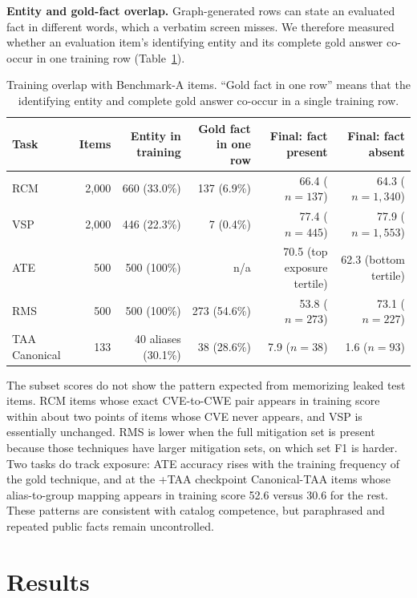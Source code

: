\documentclass[conference]{IEEEtran}
\begin{document}
\textbf{Entity and gold-fact overlap.} Graph-generated rows can state an evaluated fact in different words, which a verbatim screen misses. We therefore measured whether an evaluation item's identifying entity and its complete gold answer co-occur in one training row (Table~\ref{tab:overlap}).

\begin{table}[t]
\caption{Training overlap with Benchmark-A items. ``Gold fact in one row'' means that the identifying entity and complete gold answer co-occur in a single training row.}
\label{tab:overlap}
\centering
\scriptsize
\setlength{\tabcolsep}{3.5pt}
\begin{tabular}{@{}lrrrrr@{}}
\toprule
Task & Items & Entity in training & Gold fact in one row & Final: fact present & Final: fact absent \\
\midrule
RCM & 2,000 & 660 (33.0\%) & 137 (6.9\%) & 66.4 ($n=137$) & 64.3 ($n=1,340$) \\
VSP & 2,000 & 446 (22.3\%) & 7 (0.4\%) & 77.4 ($n=445$) & 77.9 ($n=1,553$) \\
ATE & 500 & 500 (100\%) & n/a & 70.5 (top exposure tertile) & 62.3 (bottom tertile) \\
RMS & 500 & 500 (100\%) & 273 (54.6\%) & 53.8 ($n=273$) & 73.1 ($n=227$) \\
TAA Canonical & 133 & 40 aliases (30.1\%) & 38 (28.6\%) & 7.9 ($n=38$) & 1.6 ($n=93$) \\
\bottomrule
\end{tabular}
\end{table}

The subset scores do not show the pattern expected from memorizing leaked test items. RCM items whose exact CVE-to-CWE pair appears in training score within about two points of items whose CVE never appears, and VSP is essentially unchanged. RMS is lower when the full mitigation set is present because those techniques have larger mitigation sets, on which set F1 is harder. Two tasks do track exposure: ATE accuracy rises with the training frequency of the gold technique, and at the +TAA checkpoint Canonical-TAA items whose alias-to-group mapping appears in training score 52.6 versus 30.6 for the rest. These patterns are consistent with catalog competence, but paraphrased and repeated public facts remain uncontrolled.

\section{Results}\label{sec:results}
\end{document}
